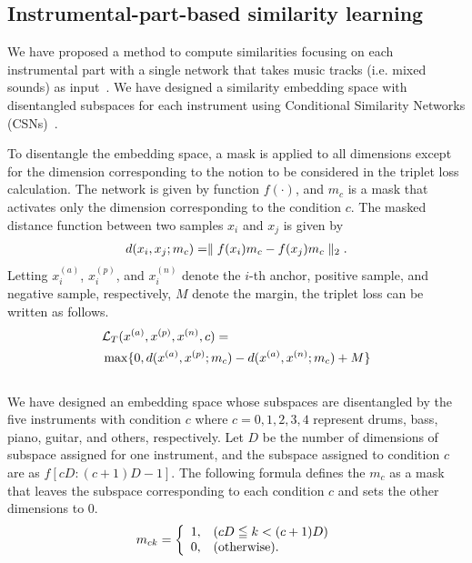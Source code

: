 \subsection{Instrumental-part-based similarity learning}
\label{disent}
We have proposed a method to compute similarities focusing on each instrumental part with a single network that takes music tracks (i.e. mixed sounds) as input~\cite{has2023}. We have designed a similarity embedding space with disentangled subspaces for each instrument using Conditional Similarity Networks (CSNs)~\cite{CSN}.
\par
To disentangle the embedding space, a mask is applied to all dimensions except for the dimension corresponding to the notion to be considered in the triplet loss calculation. The network is given by function $f(\cdot)$, and $m_c$ is a mask that activates only the dimension corresponding to the condition $c$. The masked distance function between two samples $x_i$ and $x_j$ is given by
\begin {align}
\label{CSNtriplet}
d(x_i,x_j;m_c)=\parallel f(x_i)m_c-f(x_j)m_c\parallel_2.
\vspace{-24pt}
\end{align}
Letting $x_i^{(a)}$, $x_i^{(p)}$, and $x_i^{(n)}$ denote the $i$-th anchor, positive sample, and negative sample, respectively, $M$ denote the margin, the triplet loss can be written as follows.
\begin {align}
 &\mathcal{L}_T(x^{(a)},x^{(p)},x^{(n)},c)=\notag \\
 &\max\{0,d(x^{(a)},x^{(p)};m_c)-d(x^{(a)},x^{(n)};m_c)+M\}
\end{align}
\vspace{-24pt}
\\

 We have designed an embedding space whose subspaces are disentangled by the five instruments with condition $c$ where $c=0, 1, 2, 3, 4$ represent drums, bass, piano, guitar, and others, respectively. Let $D$ be the number of dimensions of subspace assigned for one instrument, and the subspace assigned to condition $c$ are as $f[cD:(c+1)D-1]$. The following formula defines the $m_c$ as a mask that leaves the subspace corresponding to each condition $c$ and sets the other dimensions to 0. 
\begin {align}
m_{ck} = \left\{
\begin{array}{ll}
1, & (cD\leqq k<(c+1)D)\\
0, & (\mbox{otherwise}).
\end{array}
\right.
\vspace{-8pt}
\end{align}

